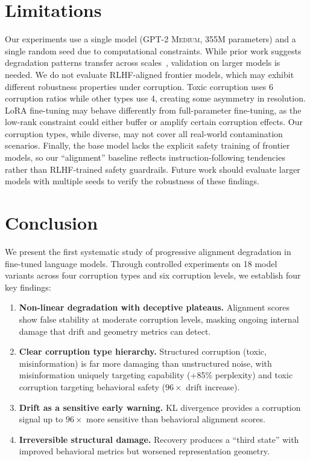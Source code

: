 \documentclass[conference]{IEEEtran}
\newcommand{\model}{\textsc{GPT-2 Medium}}
\begin{document}
\section{Limitations}
\label{sec:limitations}

Our experiments use a single model (\model{}, 355M parameters) and a single random seed due to computational constraints. While prior work suggests degradation patterns transfer across scales~\cite{mazeika2025scaling}, validation on larger models is needed. We do not evaluate RLHF-aligned frontier models, which may exhibit different robustness properties under corruption. Toxic corruption uses 6 corruption ratios while other types use 4, creating some asymmetry in resolution. LoRA fine-tuning may behave differently from full-parameter fine-tuning, as the low-rank constraint could either buffer or amplify certain corruption effects. Our corruption types, while diverse, may not cover all real-world contamination scenarios. Finally, the base model lacks the explicit safety training of frontier models, so our ``alignment'' baseline reflects instruction-following tendencies rather than RLHF-trained safety guardrails. Future work should evaluate larger models with multiple seeds to verify the robustness of these findings.

\section{Conclusion}
\label{sec:conclusion}

We present the first systematic study of progressive alignment degradation in fine-tuned language models. Through controlled experiments on 18 model variants across four corruption types and six corruption levels, we establish four key findings:

\begin{enumerate}
    \item \textbf{Non-linear degradation with deceptive plateaus.} Alignment scores show false stability at moderate corruption levels, masking ongoing internal damage that drift and geometry metrics can detect.

    \item \textbf{Clear corruption type hierarchy.} Structured corruption (toxic, misinformation) is far more damaging than unstructured noise, with misinformation uniquely targeting capability (+85\% perplexity) and toxic corruption targeting behavioral safety ($96\times$ drift increase).

    \item \textbf{Drift as a sensitive early warning.} KL divergence provides a corruption signal up to $96\times$ more sensitive than behavioral alignment scores.

    \item \textbf{Irreversible structural damage.} Recovery produces a ``third state'' with improved behavioral metrics but worsened representation geometry.
\end{enumerate}
\end{document}
